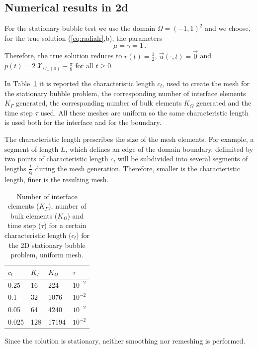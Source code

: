 \documentclass[a4paper,12pt,onecolumn]{article}
\newcommand{\bigchi}{\ensuremath{\mathrm{\mathcal{X}}}}
\newcommand{\charfcn}[1]{\bigchi_{#1}} %
\begin{document}
\subsection{Numerical results in 2d} \label{subsec:numerical_results_2d}

For the stationary bubble test we use the domain $\Omega = (-1,1)^2$ and we
choose, for the true solution (\ref{eq:radialr},b), the parameters
\begin{equation*}
\mu = \gamma = 1\,.
\end{equation*}
Therefore, the true solution reduces to $r(t) = \frac{1}{2}$, $\vec u(\cdot, t)
= \vec 0$ and $p(t) = 2\,\charfcn{\Omega_-(0)} - \frac{\pi}{8}$ for all $t \geq
0$.

In Table~\ref{tab:bubble2Delementsuniform} it is reported the characteristic
length $c_l$, used to create the mesh for the stationary bubble problem, the
corresponding number of interface elements $K_\Gamma$ generated, the
corresponding number of bulk elements $K_\Omega$ generated and the time step
$\tau$ used. All these meshes are uniform so the same characteristic length is
used both for the interface and for the boundary.

The characteristic length prescribes the size of the mesh elements. For
example, a segment of length $L$, which defines an edge of the domain boundary,
delimited by two points of characteristic length $c_l$ will be subdivided into
several segments of lengths $\frac{L}{c_l}$ during the mesh generation.
Therefore, smaller is the characteristic length, finer is the resulting mesh.
\begin{table}
 \center
\begin{tabular}{llll}
\hline
$c_l$ & $K_\Gamma$ & $K_\Omega$ & $\tau$ \\
\hline
0.25 & 16 & 224 & $10^{-2}$ \\
0.1 & 32 & 1076 & $10^{-2}$\\
0.05 & 64 & 4240 & $10^{-2}$\\
0.025 & 128 & 17194 & $10^{-2}$ \\
\hline
\end{tabular}
\caption{Number of interface elements ($K_\Gamma$), number of bulk elements
($K_\Omega$) and time step ($\tau$) for a certain characteristic length ($c_l$)
for the 2D stationary bubble problem, uniform mesh.}
\label{tab:bubble2Delementsuniform}
\end{table}

Since the solution is stationary, neither smoothing nor remeshing is performed.
\end{document}
